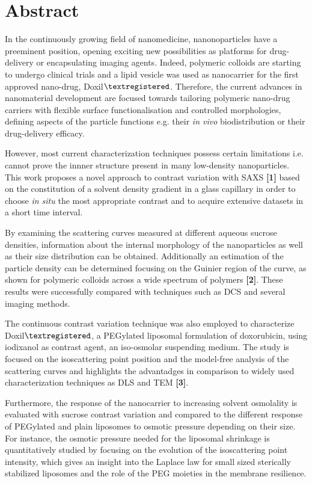 \chapter*{Abstract}
\thispagestyle{empty}


In the continuously growing field of nanomedicine, nanonoparticles have a preeminent position, opening exciting new possibilities as platforms for drug-delivery or encapsulating imaging agents. Indeed, polymeric colloids are starting to undergo clinical trials and a lipid vesicle was used as nanocarrier for the first approved nano-drug, Doxil$\textregistered$. Therefore, the current advances in nanomaterial development are focused towards tailoring polymeric nano-drug carriers with flexible surface functionalisation and controlled morphologies, defining aspects of the particle functions e.g. their \emph{in vivo} biodistribution or their drug-delivery efficacy. 

However, most current characterization techniques possess certain limitations i.e. cannot prove the innner structure present in many low-density nanoparticles. This work proposes a novel approach to contrast variation with SAXS \textbf{[1]} based on the constitution of a solvent density gradient in a glass capillary in order to choose \emph{in situ} the most appropriate contrast and to acquire extensive datasets in a short time interval.

By examining the scattering curves measured at different aqueous sucrose densities, information about the internal morphology of the nanoparticles as well as their size distribution can be obtained. Additionally an estimation of the particle density can be determined focusing on the Guinier region of the curve, as shown for polymeric colloids across a wide spectrum of polymers \textbf{[2]}. These results were successfully compared with techniques such as DCS and several imaging methods.

The continuous contrast variation technique was also employed to characterize Doxil$\textregistered$, a PEGylated liposomal formulation of doxorubicin, using iodixanol as contrast agent, an iso-osmolar suspending medium. The study is focused on the isoscattering point position and the model-free analysis of the scattering curves and highlights the advantadges in comparison to widely used characterization techniques as DLS and TEM \textbf{[3]}. 

Furthermore, the response of the nanocarrier to increasing solvent osmolality is evaluated with sucrose contrast variation and compared to the different response of PEGylated and plain liposomes to osmotic pressure depending on their size. For instance, the osmotic pressure needed for the liposomal shrinkage is quantitatively studied by focusing on the evolution of the isoscattering point intensity, which gives an insight into the Laplace law for small sized sterically stabilized liposomes and the role of the PEG moieties in the membrane resilience.

